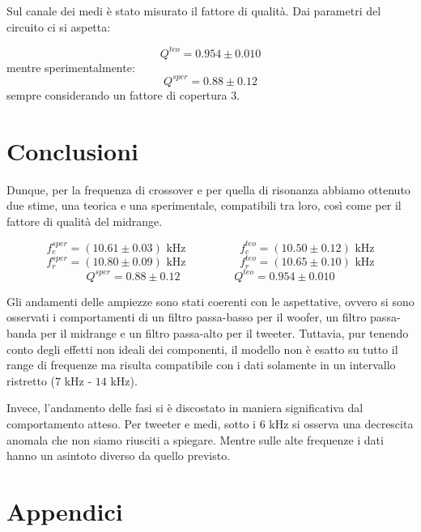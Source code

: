 \documentclass[12pt,italian]{article}
\begin{document}
Sul canale dei medi è stato misurato il fattore di qualità. Dai parametri del
circuito ci si aspetta:

\begin{equation*}
	Q^{teo} = 0.954 \pm 0.010
\end{equation*}
mentre sperimentalmente:
\begin{equation*}
	Q^{sper} = 0.88 \pm 0.12
\end{equation*}
sempre considerando un fattore di copertura $3$.

\section*{Conclusioni}

Dunque, per la frequenza di crossover e per quella di risonanza abbiamo
ottenuto due stime, una teorica e una sperimentale, compatibili tra loro, così
come per il fattore di qualità del midrange.

\begin{equation*}
	f_{c}^{sper} = (10.61 \pm 0.03) \text{ kHz} \hspace{2cm}
	f_{c}^{teo} = (10.50 \pm 0.12) \text{ kHz}
\end{equation*}
\begin{equation*}
	f_{r}^{sper} = (10.80 \pm 0.09) \text{ kHz}
	\hspace{2cm} f_{r}^{teo} = (10.65 \pm 0.10) \text{ kHz}
\end{equation*}
\begin{equation*}
	Q^{sper} = 0.88 \pm 0.12 \hspace{2cm} Q^{teo} = 0.954 \pm 0.010
\end{equation*}

Gli andamenti delle ampiezze sono stati coerenti con le aspettative, ovvero si
sono osservati i comportamenti di un filtro passa-basso per il woofer, un
filtro passa-banda per il midrange e un filtro passa-alto per il tweeter.
Tuttavia, pur tenendo conto degli effetti non ideali dei componenti, il modello
non è esatto su tutto il range di frequenze ma risulta compatibile con i dati
solamente in un intervallo ristretto ($7$ kHz - $14$ kHz).

Invece, l'andamento delle fasi si è discostato in maniera significativa dal
comportamento atteso. Per tweeter e medi, sotto i $6$ kHz si osserva una
decrescita anomala che non siamo riusciti a spiegare. Mentre sulle alte
frequenze i dati hanno un asintoto diverso da quello previsto.

\appendix
\section{Appendici}
\end{document}
